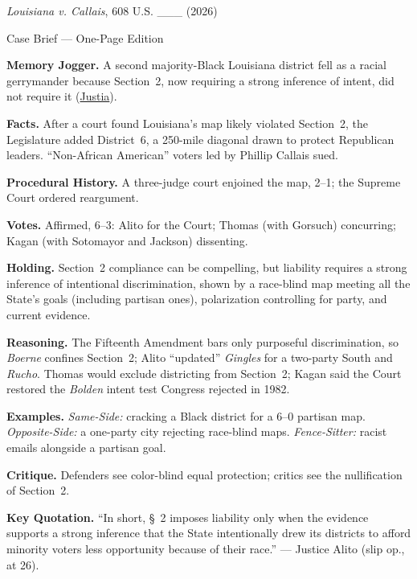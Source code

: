 \documentclass[12pt]{article}
\begin{document}
\begin{center}
{\Large \textit{Louisiana v. Callais}, 608 U.S. \_\_\_ (2026)\par}
\vspace{0.3em}
{\normalsize Case Brief --- One-Page Edition\par}
\end{center}

\textbf{Memory Jogger.} A second majority-Black Louisiana district fell as a racial gerrymander because Section~2, now requiring a strong inference of intent, did not require it (\href{https://supreme.justia.com/cases/federal/us/608/24-109/}{Justia}).

\textbf{Facts.} After a court found Louisiana's map likely violated Section~2, the Legislature added District~6, a 250-mile diagonal drawn to protect Republican leaders. ``Non-African American'' voters led by Phillip Callais sued.

\textbf{Procedural History.} A three-judge court enjoined the map, 2--1; the Supreme Court ordered reargument.

\textbf{Votes.} Affirmed, 6--3: Alito for the Court; Thomas (with Gorsuch) concurring; Kagan (with Sotomayor and Jackson) dissenting.

\textbf{Holding.} Section~2 compliance can be compelling, but liability requires a strong inference of intentional discrimination, shown by a race-blind map meeting all the State's goals (including partisan ones), polarization controlling for party, and current evidence.

\textbf{Reasoning.} The Fifteenth Amendment bars only purposeful discrimination, so \textit{Boerne} confines Section~2; Alito ``updated'' \textit{Gingles} for a two-party South and \textit{Rucho}. Thomas would exclude districting from Section~2; Kagan said the Court restored the \textit{Bolden} intent test Congress rejected in 1982.

\textbf{Examples.} \emph{Same-Side:} cracking a Black district for a 6--0 partisan map. \emph{Opposite-Side:} a one-party city rejecting race-blind maps. \emph{Fence-Sitter:} racist emails alongside a partisan goal.

\textbf{Critique.} Defenders see color-blind equal protection; critics see the nullification of Section~2.

\textbf{Key Quotation.} ``In short, \S~2 imposes liability only when the evidence supports a strong inference that the State intentionally drew its districts to afford minority voters less opportunity because of their race.'' --- Justice Alito (slip op., at 26).
\end{document}
